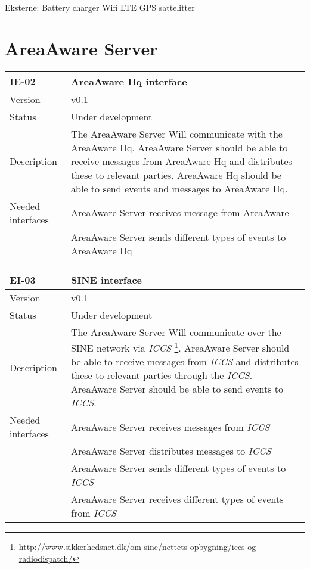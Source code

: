 Eksterne:
Battery charger
Wifi
LTE
GPS sattelitter


\section{AreaAware Server}
\begin{longtable}{| p{3.5cm} |  p{10cm} | }
	\hline
	\textbf{IE-02} &  \textbf{AreaAware Hq interface } \\
	\hline
	Version & v0.1 \\
	\hline
	Status & Under development \\
	\hline
	Description & The AreaAware Server Will communicate with the AreaAware Hq. AreaAware Server should be able to receive messages from AreaAware Hq and distributes these to relevant parties.  AreaAware Hq should be able to send events and messages to AreaAware Hq.
	\\
	\hline
	Needed interfaces & AreaAware Server receives message from AreaAware \\
	& AreaAware Server sends different types of events to AreaAware Hq \\
	\hline
\end{longtable}

\begin{longtable}{| p{3.5cm} |  p{10cm} | }
	\hline
	\textbf{EI-03} &  \textbf{SINE interface} \\
	\hline
	Version & v0.1 \\
	\hline
	Status & Under development \\
	\hline
	Description & The AreaAware Server Will communicate over the SINE network via \emph{ICCS} \footnote{\url{http://www.sikkerhedsnet.dk/om-sine/nettets-opbygning/iccs-og-radiodispatch/}}. AreaAware Server should be able to receive messages from \emph{ICCS} and distributes these to relevant parties through the \emph{ICCS}.  AreaAware Server should be able to send events to \emph{ICCS}.
	\\
	\hline
	Needed interfaces 
	& AreaAware Server receives messages from \emph{ICCS} \\
	& AreaAware Server distributes messages to \emph{ICCS} \\
	& AreaAware Server sends different types of events to \emph{ICCS} \\
	& AreaAware Server receives different types of events from \emph{ICCS} \\
	\hline
\end{longtable}


